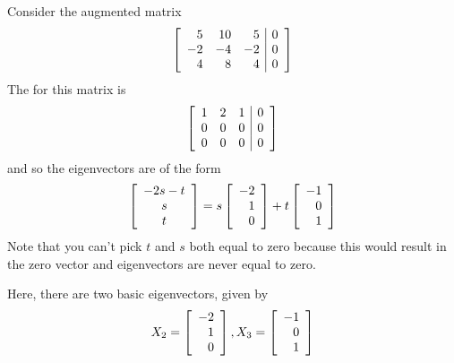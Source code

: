 \begin{solution}
Consider the augmented matrix 
\begin{equation*}
\left[
\begin{array}{rrr|r}
5 & 10 & 5 & 0 \\
 -2 &  -4  &  -2 & 0 \\
4 & 8  & 4 & 0
\end{array}
\right]
\end{equation*}
The {\rref} for this matrix is
\begin{equation*}
\left[
\begin{array}{rrr|r}
1 & 2 & 1 & 0 \\
0 & 0 & 0 & 0 \\
0 & 0 & 0 & 0
\end{array}
\right]
\end{equation*}
and so the eigenvectors are of the form
\begin{equation*}
\left[
\begin{array}{c}
-2s-t \\
s \\
t
\end{array}
\right] =s\left[
\begin{array}{r}
-2 \\
1 \\
0
\end{array}
\right] +t\left[
\begin{array}{r}
-1 \\
0 \\
1
\end{array}
\right] 
\end{equation*}
Note that you can't pick $t$ and $s$ both equal to zero because this would result in
the zero vector and eigenvectors are never equal to zero. 

Here, there are two basic eigenvectors, given by 
\begin{equation*}
X_2
=
\left[
\begin{array}{r}
-2 \\
1\\
0
\end{array}
\right] ,
X_3
=
\left[
\begin{array}{r}
-1 \\
0 \\
1
\end{array}
\right]
\end{equation*}


\end{solution}

